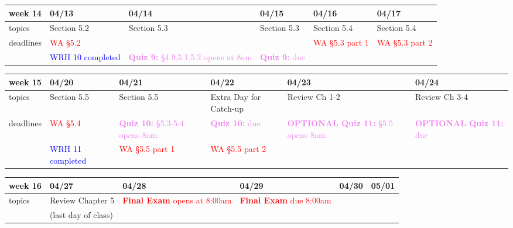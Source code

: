 \documentclass[11pt]{article}
\begin{document}
\begin{center}
\begin{tabularx}{\textwidth}{|p{1.5cm}|| L | L | L | L | L |}
\hline
week 14&04/13&04/14&04/15&04/16&04/17\\ \hline
topics &Section 5.2&Section 5.3&Section 5.3&Section 5.4&Section 5.4\\  \hline
deadlines&\textcolor{red}{WA \S 5.2}  &&&\textcolor{red}{WA \S 5.3 part 1}&\textcolor{red}{WA \S5.3 part 2} \\ 
&\textcolor{blue}{WRH 10 completed}&\textcolor{violet}{\textbf{Quiz 9:} \S4.9,5.1,5.2 opens at 8am }&\textcolor{violet}{\textbf{Quiz 9:}  due }&&\\ \hline \end{tabularx} \end{center}

\begin{center}
\begin{tabularx}{\textwidth}{|p{1.5cm}|| L | L | L | L | L |}
\hline
week 15&04/20&04/21&04/22&04/23&04/24\\ \hline
topics&Section 5.5&Section 5.5&Extra Day for Catch-up&Review Ch 1-2&Review Ch 3-4\\ \hline
deadlines&\textcolor{red}{WA \S 5.4} &\textcolor{violet}{\textbf{Quiz 10:} \S 5.3-5.4 opens 8am }&\textcolor{violet}{\textbf{Quiz 10:} due }&\textcolor{violet}{\textbf{OPTIONAL Quiz 11:} \S 5.5 opens 8am }&\textcolor{violet}{\textbf{OPTIONAL Quiz 11:} due}\\ 
&\textcolor{blue}{WRH 11 completed}&\textcolor{red}{WA \S 5.5 part 1}&\textcolor{red}{WA \S 5.5 part 2}&& \\ \hline \end{tabularx} \end{center}

\begin{center}
\begin{tabularx}{\textwidth}{|p{1.5cm}|| L | L | L | L | L |}
\hline
week 16&04/27&04/28&04/29&04/30&05/01\\ \hline
topics&Review Chapter 5&\textcolor{red}{\textbf{Final Exam} opens at 8:00am} &\textcolor{red}{\textbf{Final Exam} due 8:00am}&&\\ 
&(last day of class)&&&&\\ \hline \hline
\end{tabularx} \end{center}
\end{document}
